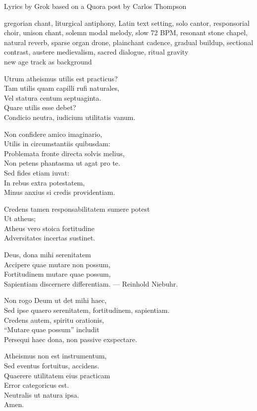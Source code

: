 

\begin{notes}
Lyrics by Grok based on a Quora post by Carlos Thompson
\end{notes}
\begin{style}
gregorian chant, liturgical antiphony, Latin text setting, solo cantor, responsorial choir, unison chant, solemn modal melody, slow 72 BPM, resonant stone chapel, natural reverb, sparse organ drone, plainchant cadence, gradual buildup, sectional contrast, austere medievalism, sacred dialogue, ritual gravity\\
new age track as background
\end{style}
\begin{lyrics}
 Utrum atheismus utilis est practicus?\\
 Tam utilis quam capilli rufi naturales,\\
Vel statura centum septuaginta.\\
Quare utilis esse debet?\\
Condicio neutra, iudicium utilitatis vanum.

Non confidere amico imaginario,\\
Utilis in circumstantiis quibusdam:\\
Problemata fronte directa solvis melius,\\
Non petens phantasma ut agat pro te.\\
Sed fides etiam iuvat:\\
In rebus extra potestatem,\\
Minus anxius si credis providentiam.

Credens tamen responsabilitatem sumere potest\\
Ut atheus;\\
Atheus vero stoica fortitudine\\
Adversitates incertas sustinet.

Deus, dona mihi serenitatem\\
Accipere quae mutare non possum,\\
Fortitudinem mutare quae possum,\\
Sapientiam discernere differentiam.
— Reinhold Niebuhr.

Non rogo Deum ut det mihi haec,\\
Sed ipse quaero serenitatem, fortitudinem, sapientiam.\\
Credens autem, spiritu orationis,\\
“Mutare quae possum” includit\\
Persequi haec dona, non passive exspectare.

Atheismus non est instrumentum,\\
Sed eventus fortuitus, accidens.\\
Quaerere utilitatem eius practicam\\
Error categoricus est.\\
Neutralis ut natura ipsa.\\
Amen.
\end{lyrics}

